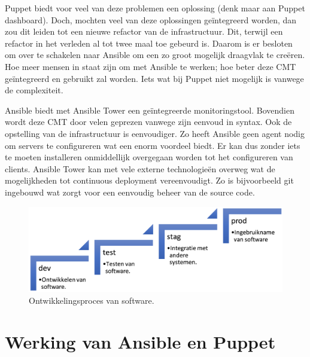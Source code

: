 Puppet biedt voor veel van deze problemen een oplossing (denk maar aan Puppet dashboard). Doch, mochten veel van deze oplossingen ge\"integreerd worden, dan zou dit leiden tot een  nieuwe refactor van de infrastructuur. Dit, terwijl een refactor in het verleden al tot twee maal toe gebeurd is. Daarom is er besloten om over te schakelen naar Ansible om een zo groot mogelijk draagvlak te cre\"eren. Hoe meer mensen in staat zijn om met Ansible te werken; hoe beter deze \gls{CMT} ge\"integreerd en gebruikt zal worden. Iets wat bij Puppet niet mogelijk is vanwege de complexiteit.

Ansible biedt met Ansible Tower een ge\"integreerde monitoringstool. Bovendien wordt deze \gls{CMT} door velen geprezen vanwege zijn eenvoud in syntax. Ook de opstelling van de infrastructuur is eenvoudiger. Zo heeft Ansible geen agent nodig om servers te configureren wat een enorm voordeel biedt. Er kan dus zonder iets te moeten installeren onmiddellijk overgegaan worden tot het configureren van clients. Ansible Tower kan met vele externe technologie\"en overweg wat de mogelijkheden tot continuous deployment vereenvoudigt. Zo is bijvoorbeeld git ingebouwd wat zorgt voor een eenvoudig beheer van de source code.

\begin{figure}
	\includegraphics[width=\linewidth]{img/multistage.png} 
	\caption{Ontwikkelingsproces van software.}  
	  \label{fig:multistage}
\end{figure}




\section{Werking van Ansible en Puppet}
\label{sec:methodologie-technische-verschillen}

